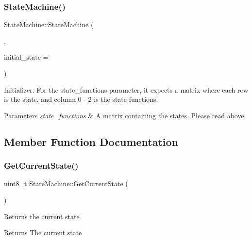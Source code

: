 \subsubsection{\texorpdfstring{State\+Machine()}{StateMachine()}}
{\footnotesize\ttfamily State\+Machine\+::\+State\+Machine (\begin{DoxyParamCaption}\item[{void($\ast$($\ast$\hyperlink{class_state_machine_acc87359cd98c436f5b891ffe6cb67160}{state\+\_\+functions}))(void)}]{,  }\item[{uint8\+\_\+t}]{initial\+\_\+state = {} }\end{DoxyParamCaption})\hspace{0.3cm}{\ttfamily [inline]}}

Initializer. For the state\+\_\+functions parameter, it expects a matrix where each row is the state, and column 0 -\/ 2 is the state functions. 
\begin{DoxyParams}{Parameters}
{\em state\+\_\+functions} & A matrix containing the states. Please read above \\
\hline
\end{DoxyParams}


\subsection{Member Function Documentation}
\hypertarget{class_state_machine_a62fd24666d16a2425c8397ce2d326dae}{}\label{class_state_machine_a62fd24666d16a2425c8397ce2d326dae} 
\subsubsection{\texorpdfstring{Get\+Current\+State()}{GetCurrentState()}}
{\footnotesize\ttfamily uint8\+\_\+t State\+Machine\+::\+Get\+Current\+State (\begin{DoxyParamCaption}{ }\end{DoxyParamCaption})}

Returns the current state \begin{DoxyReturn}{Returns}
The current state 
\end{DoxyReturn}
\hypertarget{class_state_machine_a94c93f8203bab4f5a3784eba7445b582}{}\label{class_state_machine_a94c93f8203bab4f5a3784eba7445b582} 
